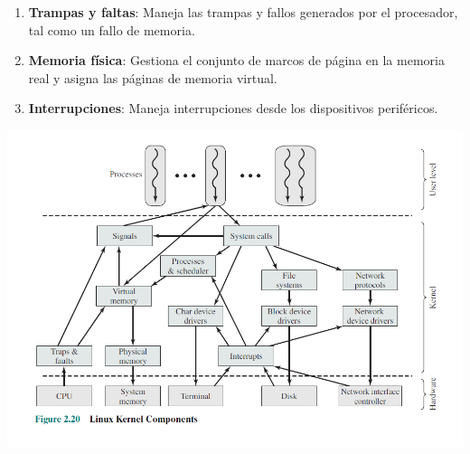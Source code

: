 \begin{itemize}
\begin{enumerate}
\item \textbf{Trampas y faltas}: Maneja las trampas y fallos generados por el procesador, tal como un fallo de memoria.
\item \textbf{Memoria física}: Gestiona el conjunto de marcos de página en la memoria real y asigna las páginas de memoria virtual.
\item \textbf{Interrupciones}: Maneja interrupciones desde los dispositivos periféricos.\\
\end{enumerate}
\centering
\begin{center}
\includegraphics[scale=1.0]{imagenes/componentes.png}
\end{center}

	\end{itemize}
